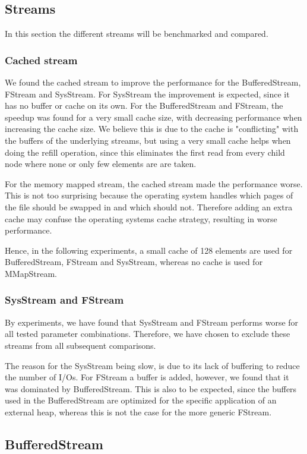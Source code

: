 \subsection{Streams}
In this section the different streams will be benchmarked and compared.

\subsubsection{Cached stream}
We found the cached stream to improve the performance for the BufferedStream, FStream and SysStream. For SysStream the improvement is expected, since it has no buffer or cache on its own. For the BufferedStream and FStream, the speedup was found for a very small cache size, with decreasing performance when increasing the cache size. We believe this is due to the cache is "conflicting" with the buffers of the underlying streams, but using a very small cache helps when doing the refill operation, since this eliminates the first read from every child node where none or only few elements are are taken.

For the memory mapped stream, the cached stream made the performance worse. This is not too surprising because the operating system handles which pages of the file should be swapped in and which should not. Therefore adding an extra cache may confuse the operating systems cache strategy, resulting in worse performance.

Hence, in the following experiments, a small cache of 128 elements are used for BufferedStream, FStream and SysStream, whereas no cache is used for MMapStream.

\subsubsection{SysStream and FStream}
By experiments, we have found that SysStream and FStream performs worse for all tested parameter combinations. Therefore, we have chosen to exclude these streams from all subsequent comparisons.

The reason for the SysStream being slow, is due to its lack of buffering to reduce the number of I/Os. For FStream a buffer is added, however, we found that it was dominated by BufferedStream. This is also to be expected, since the buffers used in the BufferedStream are optimized for the specific application of an external heap, whereas this is not the case for the more generic FStream.

\subsection{BufferedStream}


